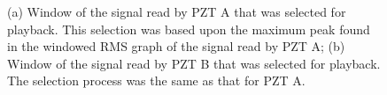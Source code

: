 \documentclass[11pt,letterpaper]{article}%
\begin{document}
\begin{figure}
\begin{subfigmatrix}{2}
\end{subfigmatrix}

   \caption[all]
   { \label{selectedWindows}
(a) Window of the signal read by PZT A that was selected for playback. This selection was based upon the maximum peak found in the windowed RMS graph of the signal read by PZT A;
(b) Window of the signal read by PZT B that was selected for playback. The selection process was the same as that for PZT A.
 }
   \end{figure}
   
\end{document}
